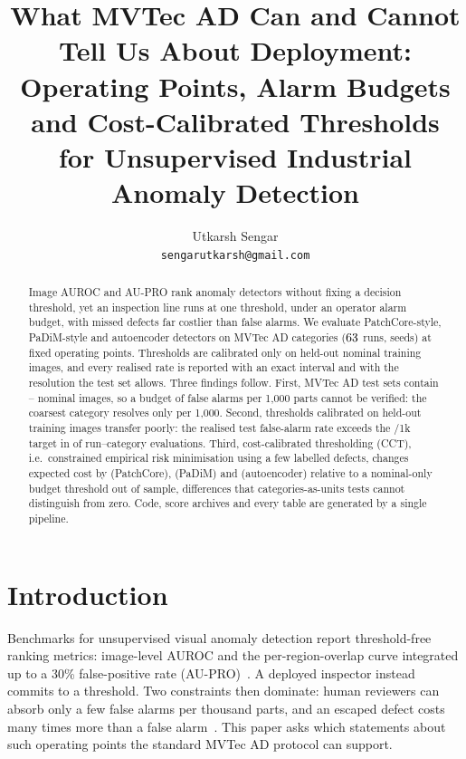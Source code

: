 \documentclass[11pt,letterpaper]{article}
\title{What MVTec AD Can and Cannot Tell Us About Deployment:\\
Operating Points, Alarm Budgets and Cost-Calibrated Thresholds\\
for Unsupervised Industrial Anomaly Detection}
\author{Utkarsh Sengar\\{\tt\small sengarutkarsh@gmail.com}}
\begin{document}
\maketitle

\begin{abstract}
Image AUROC and AU-PRO rank anomaly detectors without fixing a decision threshold, yet an inspection line
runs at one threshold, under an operator alarm budget, with missed defects far costlier than false alarms.
We evaluate PatchCore-style, PaDiM-style and autoencoder detectors on \NumCategories{} MVTec AD categories
($63$ runs, \NumSeeds{} seeds) at fixed operating points. Thresholds are calibrated only on held-out
nominal training images, and every realised rate is reported with an exact interval and with the resolution
the test set allows. Three findings follow. First, MVTec AD test sets contain \MinTestNominal--\MaxTestNominal{}
nominal images, so a budget of \PrimaryBudget{} false alarms per 1,000 parts cannot be verified: the
coarsest category resolves only \CoarsestResolution{} per 1,000. Second, thresholds calibrated on held-out
training images transfer poorly: the realised test false-alarm rate exceeds the \PrimaryBudget/1k target in
\BudgetViolationShare{} of run--category evaluations. Third, cost-calibrated thresholding (CCT), i.e.\
constrained empirical risk minimisation using a few labelled defects, changes expected cost by
\CCTCostChangePatchCore{} (PatchCore), \CCTCostChangePaDiM{} (PaDiM) and \CCTCostChangeAE{} (autoencoder)
relative to a nominal-only budget threshold out of sample, differences that categories-as-units tests cannot
distinguish from zero. Code, score archives and every table are generated by a single pipeline.
\end{abstract}

\section{Introduction}
Benchmarks for unsupervised visual anomaly detection report threshold-free ranking metrics: image-level
AUROC and the per-region-overlap curve integrated up to a 30\% false-positive rate
(AU-PRO)~\cite{bergmann2019mvtec,bergmann2020uninformed,bergmann2021mvtec}. A deployed inspector instead
commits to a threshold. Two constraints then dominate: human reviewers can absorb only a few false alarms per
thousand parts, and an escaped defect costs many times more than a false alarm~\cite{elkan2001foundations}.
This paper asks which statements about such operating points the standard MVTec AD protocol can support.
\end{document}
